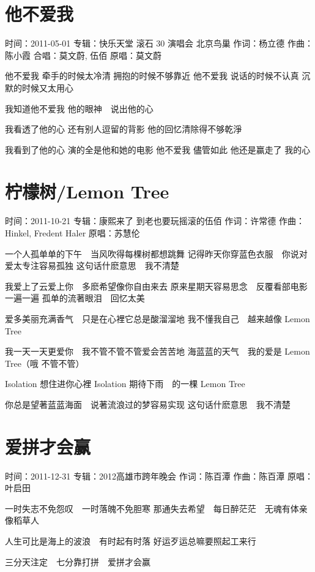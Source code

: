 \documentclass[UTF8,a4paper,oneside,twocolumn,12pt]{ctexbook}
\newcommand{\infopair}[2]{\textbullet #1：#2}
\newcommand{\zc}[1][伍佰]{\infopair{作词}{#1}}
\newcommand{\zq}[1][伍佰]{\infopair{作曲}{#1}}
\newcommand{\zj}[1]{\infopair{专辑}{#1}}
\newcommand{\yc}[1]{\infopair{原唱}{#1}}
\newcommand{\sj}[1]{\infopair{时间}{#1}}
\newenvironment{info}{\begin{flushleft}\kaishu
	}
	{\end{flushleft}\normalsize\yahei\par}
\newenvironment{lyric}{
	}
{}
\begin{document}
\section{他不爱我}%
\begin{info}
	\sj{2011-05-01}
	\zj{快乐天堂 滚石 30 演唱会 北京鸟巢}
	\zc[杨立德]
	\zq[陈小霞]
	\infopair{合唱}{莫文蔚, 伍佰}
	\yc{莫文蔚}
\end{info}
\begin{lyric}
	他不爱我 牵手的时候太冷清 拥抱的时候不够靠近
	他不爱我 说话的时候不认真 沉默的时候又太用心

	我知道他不爱我
	他的眼神　说出他的心

	我看透了他的心 还有别人逗留的背影
	他的回忆清除得不够乾淨

	我看到了他的心 演的全是他和她的电影
	他不爱我 儘管如此 他还是赢走了 我的心
\end{lyric}

\section{柠檬树/Lemon Tree}
\begin{info}
	\sj{2011-10-21}
	\zj{康熙来了 到老也要玩摇滚的伍佰}
	\zc[许常德]
	\zq[Hinkel, Fredent Haler]
	\yc{苏慧伦}
\end{info}
\begin{lyric}
	一个人孤单单的下午　当风吹得每棵树都想跳舞
	记得昨天你穿蓝色衣服　你说对爱太专注容易孤独
	这句话什麽意思　我不清楚

	我爱上了云爱上你　多麽希望像你自由来去
	原来星期天容易思念　反覆看部电影一遍一遍
	孤单的流著眼泪　回忆太美

	爱多美丽充满香气　只是在心裡它总是酸溜溜地
	我不懂我自己　越来越像 Lemon Tree

	我一天一天更爱你　我不管不管不管爱会苦苦地
	海蓝蓝的天气　我的爱是 Lemon Tree（哦 不管不管）

	Isolation 想住进你心裡
	Isolation 期待下雨　的一棵 Lemon Tree

	你总是望著蓝蓝海面　说著流浪过的梦容易实现
	这句话什麽意思　我不清楚
\end{lyric}

\section{爱拼才会赢}
\begin{info}
	\sj{2011-12-31}
	\zj{2012高雄市跨年晚会}
	\zc[陈百潭]
	\zq[陈百潭]
	\yc{叶启田}
\end{info}
\begin{lyric}
	一时失志不免怨叹　一时落魄不免胆寒
	那通失去希望　每日醉茫茫　无魂有体亲像稻草人

	人生可比是海上的波浪　有时起有时落
	好运歹运总嘛要照起工来行

	三分天注定　七分靠打拼　爱拼才会赢
\end{lyric}
\end{document}
